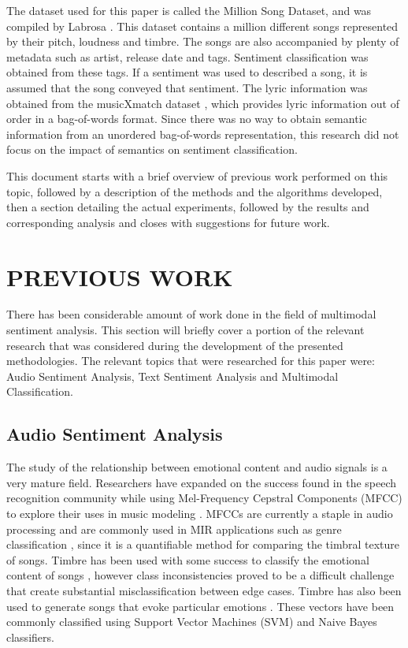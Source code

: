   The dataset used for this paper is called the Million Song Dataset, and 
  was compiled by Labrosa \cite{Bertin-Mahieux2011}. This dataset contains a million different songs
  represented by their pitch, loudness and timbre. The songs are also accompanied 
  by plenty of metadata such as artist, release date and  tags. Sentiment classification
   was obtained from these tags. If a sentiment was used to described a song, it is assumed that 
  the song conveyed that sentiment. The lyric information was obtained from the
  musicXmatch dataset  \cite{musicXmatchDataset}, which provides lyric information out of order in a 
  bag-of-words format. Since there was no way to obtain semantic information 
  from an unordered bag-of-words representation, this research did not focus 
  on the impact of semantics on sentiment classification. 
      
 This document starts with a brief overview of previous work performed on this 
 topic, followed by a description of the methods and the algorithms developed,
 then a section detailing the actual experiments, followed by the results and corresponding analysis
 and closes with suggestions for future work.
 
 \chapter{PREVIOUS WORK}

There has been considerable amount of work done in the field of multimodal 
sentiment analysis. This section will briefly cover a portion of the relevant 
research that was considered during the development of the presented 
methodologies. The relevant topics that were researched for this paper were: Audio Sentiment 
Analysis, Text Sentiment Analysis and Multimodal Classification.


\section{Audio Sentiment Analysis}

The study of the relationship between emotional content and audio signals is a 
very mature field. Researchers have expanded on the success found in the 
speech recognition community while using Mel-Frequency Cepstral Components 
(MFCC) to explore their uses in music modeling \cite{Logan00melfrequency}. MFCCs are currently a 
staple in audio processing and are commonly used in MIR applications such 
as genre classification \cite{Tzanetakis01automaticmusical}, since it is a quantifiable method for comparing the 
timbral texture of songs. Timbre has been used with some success to classify the 
emotional content of songs \cite{University03detectingemotion}, however class inconsistencies proved to be 
a difficult challenge that create substantial misclassification between edge cases. 
Timbre has also been used to generate songs that evoke particular emotions \cite{transprose}.  
These vectors have been commonly classified using 
Support Vector Machines (SVM) and Naive Bayes classifiers. 

